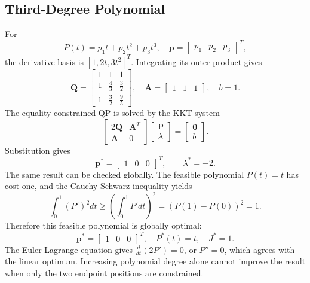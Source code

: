 \documentclass[letterpaper,10pt,conference]{IEEEtran}
\newcommand{\vect}[1]{\bm{#1}}
\begin{document}
\subsection{Third-Degree Polynomial}
For
\begin{equation}
P(t)=p_1t+p_2t^2+p_3t^3,
\quad \vect{p}=\begin{bmatrix}p_1&p_2&p_3\end{bmatrix}^{T},
\end{equation}
the derivative basis is $[1,2t,3t^2]^T$. Integrating its outer product gives
\begin{equation}
\boxed{
\vect{Q}=\begin{bmatrix}
1&1&1\\
1&\frac{4}{3}&\frac{3}{2}\\
1&\frac{3}{2}&\frac{9}{5}
\end{bmatrix}},
\quad
\vect{A}=\begin{bmatrix}1&1&1\end{bmatrix},
\quad b=1.
\end{equation}
The equality-constrained QP is solved by the KKT system
\begin{equation}
\begin{bmatrix}
2\vect{Q}&\vect{A}^{T}\\
\vect{A}&0
\end{bmatrix}
\begin{bmatrix}\vect{p}\\\lambda\end{bmatrix}
=
\begin{bmatrix}\vect{0}\\b\end{bmatrix}.
\end{equation}
Substitution gives
\begin{equation}
\vect{p}^{*}=\begin{bmatrix}1&0&0\end{bmatrix}^{T},
\qquad \lambda^{*}=-2.
\end{equation}
The same result can be checked globally. The feasible polynomial $P(t)=t$ has cost one, and the Cauchy-Schwarz inequality yields
\begin{equation}
\int_0^1(P')^2dt\geq
\left(\int_0^1P'dt\right)^2=(P(1)-P(0))^2=1.
\end{equation}
Therefore this feasible polynomial is globally optimal:
\begin{equation}
\boxed{\vect{p}^{*}=\begin{bmatrix}1&0&0\end{bmatrix}^{T},
\quad P^*(t)=t,\quad J^*=1.}
\end{equation}
The Euler-Lagrange equation gives $\frac{d}{dt}(2P')=0$, or $P''=0$, which agrees with the linear optimum. Increasing polynomial degree alone cannot improve the result when only the two endpoint positions are constrained.
\end{document}
